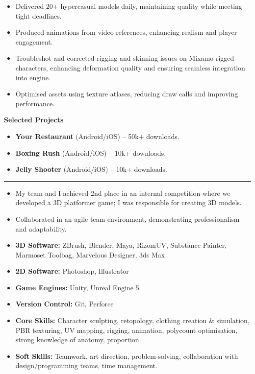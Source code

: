 \documentclass[10pt,a4paper]{altacv}
\begin{document}
\begin{fullwidth}
\begin{itemize}
    \item Delivered 20+ hypercasual models daily, maintaining quality while meeting tight deadlines.  
    \item Produced animations from video references, enhancing realism and player engagement.  
    \item Troubleshot and corrected rigging and skinning issues on Mixamo-rigged characters, enhancing deformation quality and ensuring seamless integration into engine.  
    \item Optimised assets using texture atlases, reducing draw calls and improving performance.  
\end{itemize}
\textbf{Selected Projects}
\begin{itemize}
    \item \textbf{Your Restaurant} (Android/iOS) – 50k+ downloads.  
    \item \textbf{Boxing Rush} (Android/iOS) – 10k+ downloads.  
    \item \textbf{Jelly Shooter} (Android/iOS) – 10k+ downloads.  
\end{itemize}

{\color{SlateGrey}\rule{\linewidth}{1pt}}

\begin{itemize}
\item My team and I achieved 2nd place in an internal competition where we developed a 3D platformer game; I was responsible for creating 3D models.
\item Collaborated in an agile team environment, demonstrating professionalism and adaptability.
\end{itemize}

\begin{itemize}
    \item \textbf{3D Software:} ZBrush, Blender, Maya, RizomUV, Substance Painter, Marmoset Toolbag, Marvelous Designer, 3ds Max  
    \item \textbf{2D Software:} Photoshop, Illustrator
    \item \textbf{Game Engines:} Unity, Unreal Engine 5
    \item \textbf{Version Control:} Git, Perforce  
    \item \textbf{Core Skills:} Character sculpting, retopology, clothing creation \& simulation,  PBR texturing, UV mapping, rigging, animation, polycount optimisation, strong knowledge of anatomy, proportion.  
    \item \textbf{Soft Skills:} Teamwork, art direction, problem-solving, collaboration with design/programming teams, time management. 
\end{itemize}   


\end{fullwidth}
\end{document}
